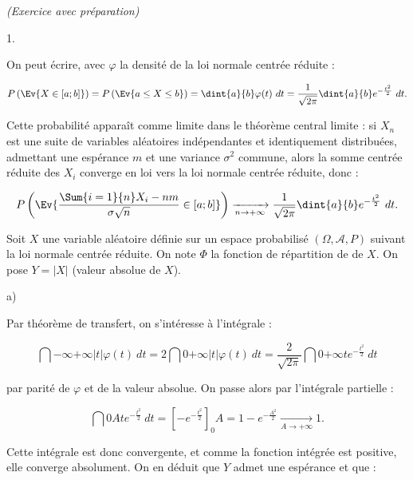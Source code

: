 \documentclass[11pt]{article}%
\begin{document}
 \newpage


 \begin{exercice}{\it (Exercice avec préparation)}~
 \begin{noliste}{1.}
 \setlength{\itemsep}{4mm}
 \item On peut écrire, avec $\varphi$ la densité de la loi normale
centrée réduite : 
 
\[
 P \left(\Ev{ X \in [a;b] }\right) = P \left(\Ev{ a \leq X \leq b
}\right) = \dint{a}{b} \varphi (t) \ dt = \frac{ 1 }{ \sqrt{ 2 \pi } }
\dint{a}{b} e^{ - \frac{ t^{2} }{ 2 } } \ dt. 
\]

 Cette probabilité apparaît comme limite dans le théorème central
limite : si $X_{n}$ est une suite de variables aléatoires indépendantes
et identiquement distribuées, admettant une espérance $m$ et une
variance $\sigma^{2}$ commune, alors la somme centrée réduite des
$X_{i}$ converge en loi vers la loi normale centrée réduite, donc : 
 
\[
 P \left(\Ev{ \frac{ \Sum{i = 1}{n} X_{i} - n m }{ \sigma \sqrt{n} }
\in [a ; b ]}\right) \xrightarrow[ n \rightarrow + \infty ]{} \frac{ 1
}{ \sqrt{ 2 \pi } } \dint{a}{b} e^{ - \frac{ t^{2} }{ 2 } } \ dt. 
\]

 Soit $X$ une variable aléatoire définie sur un espace probabilisé
$(\Omega, \mathcal{A}, P)$ suivant la loi normale centrée réduite. On
note $\Phi$ la fonction de répartition de de $X$. On pose $Y = | X |$
(valeur absolue de $X$).

 \item \begin{noliste}{a)}
 \setlength{\itemsep}{2mm}

 \item Par théorème de transfert, on s'intéresse à l'intégrale : 
 
\[
 \dint{-\infty}{+ \infty} | t | \varphi (t) \ dt = 2 \dint{0}{+ \infty}
| t | \varphi (t) \ dt = \frac{ 2 }{ \sqrt{ 2 \pi } } \dint{0}{+
\infty} t e^{ - \frac{ t^{2} }{ 2 } } \ dt 
\]

 par parité de $\varphi$ et de la valeur absolue. On passe alors par
l'intégrale partielle : 
 
\[
 \dint{0}{A} t e^{ - \frac{ t^{2} }{ 2 } } \ dt = \left[ - e^{ - \frac{
t^{2} }{ 2 } } \right]_{0}{A} = 1 - e^{ - \frac{ A^{2} }{ 2 } }
\xrightarrow[ A \rightarrow + \infty ]{} 1. 
\]

 Cette intégrale est donc convergente, et comme la fonction intégrée
est positive, elle converge absolument. On en déduit que $Y$ admet une
espérance et que : 
 

\end{noliste}
\end{noliste}
\end{exercice}
\end{document}
